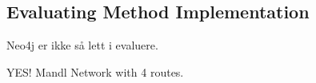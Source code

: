 \subsection{Evaluating Method Implementation}

Neo4j er ikke så lett i evaluere.


YES! Mandl Network with 4 routes.



